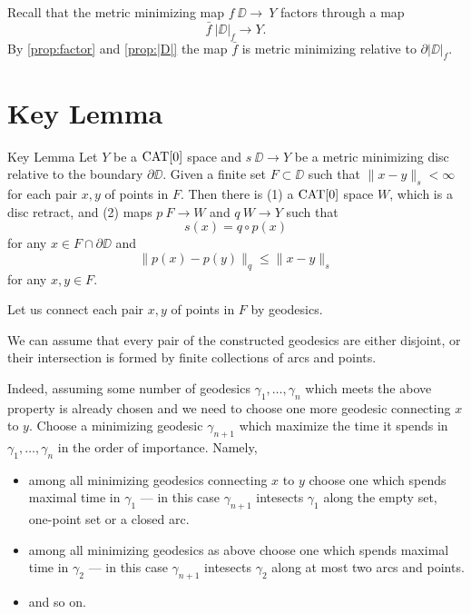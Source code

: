 \documentclass[a4paper,10pt]{amsart}
\begin{document}
Recall that the metric minimizing map $f\:\DD\to\ Y$ factors through a map \[\bar f\:|\DD|_f\to Y.\]
By \ref{prop:factor} and \ref{prop:|D|} 
the map $\bar f$
is metric minimizing relative to $\partial|\DD|_f$.











\section{Key Lemma}


\begin{thm}{Key Lemma}\label{lem:key}
Let $Y$ be a $\mathop{\rm CAT}\nolimits[0]$ space and $s\:\DD\to Y$ 
be a metric minimizing disc relative to the boundary $\partial \DD$.
Given a finite set $F\subset \DD$ such that $\|x-y\|_s<\infty$ for each pair $x,y$ of points in $F$. Then
there is 
(1) a $\mathop{\rm CAT}\nolimits[0]$ space $W$, which is a disc retract,
and (2) maps $p\:F\to W$ and $q\:W\to Y$ such that
\[s(x)=q\circ p(x)\] 
for any $x\in F\cap \partial \DD$
and 
\[\|p(x)-p(y)\|_q\le \|x-y\|_s\] 
for any $x,y\in F$.
\end{thm}

Let us connect each pair $x,y$ of points in $F$ by geodesics.

We can assume that 
every pair of the constructed geodesics 
are either disjoint, or their intersection is formed by finite collections of arcs and points.

Indeed, assuming some number of geodesics $\gamma_1,\dots,\gamma_n$ which meets the above property is already chosen and we need to choose one more geodesic connecting $x$ to $y$.
Choose a minimizing geodesic $\gamma_{n+1}$ which maximize the time it spends in $\gamma_1,\dots,\gamma_n$  in the order of importance.
Namely, 
\begin{itemize}
\item  among all minimizing geodesics connecting $x$ to $y$
choose one which spends maximal time in $\gamma_1$ --- in this case $\gamma_{n+1}$ intesects $\gamma_1$ along the empty set, one-point set or a closed arc.
\item among all minimizing geodesics as above
choose one which spends maximal time in $\gamma_2$ --- in this case $\gamma_{n+1}$ intesects $\gamma_2$ along at most two arcs and points.
\item and so on.
\end{itemize}
\end{document}
